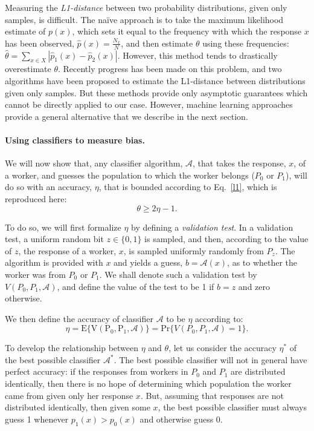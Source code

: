 \documentclass[12pt]{article}
\begin{document}
Measuring the \textit{L1-distance} between two probability distributions,
given only samples, is difficult.  The na\"ive approach is to take
the maximum likelihood estimate of $p(x)$, which sets it equal to the 
frequency with which the response $x$ has been observed, 
$\hat{p}(x) = \frac{N_x}{N}$, and then estimate $\theta$ 
using these frequencies: 
$\hat{\theta} = \sum_{x \in X}|\hat{p}_1(x) - \hat{p}_2(x)|$.  
However, this method tends to drastically overestimate $\theta$.
Recently progress has been made on this problem, and two algorithms have 
been proposed to estimate the L1-distance between distributions
given only samples.  But these methods provide only asymptotic guarantees
which cannot be directly applied to our case.  However, machine learning
approaches provide a general alternative that we describe in the next 
section.

\paragraph{Using classifiers to measure bias.}

We will now show that, any classifier algorithm, $\mathcal{A}$, that
takes the response, $x$, of a worker, and guesses the population to which
the worker belongs ($P_0$ or $P_1$), will do so with an accuracy, $\eta$,
that is bounded according to Eq.~\ref{l1}, which is reproduced here:
$$
	\theta \geq 2\eta - 1.
$$

To do so, we will first formalize $\eta$ by defining a 
\textit{validation test}.  In a validation test, a uniform random bit 
$z\in\{0,1\}$ is sampled, and then, according to the value of $z$, the
response of a worker, $x$, is sampled uniformly randomly from $P_z$.  
The algorithm is provided
with $x$ and yields a guess, $b=\mathcal{A}(x)$, as to whether the worker was 
from $P_0$ or $P_1$.  We shall denote such a validation test by 
$V(P_0, P_1, \mathcal{A})$, and define the value of the test to be 1 if 
$b=z$ and zero otherwise.  

We then define the accuracy of classifier $\mathcal{A}$ to be $\eta$ according
to:
$$
\eta = \mathrm{E\{V(P_0, P_1, \mathcal{A})\}} 
	= \mathrm{Pr}\{V(P_0, P_1, \mathcal{A})=1\}.
$$

To develop the relationship between $\eta$ and $\theta$, let us consider
the accuracy $\eta^*$ of the best possible classifier $\mathcal{A}^*$.
The best possible classifier will not in general have perfect accuracy:
if the responses from workers in $P_0$ and $P_1$ are distributed 
identically, then there is no hope of determining which population the worker 
came from given only her response $x$.  But, assuming that responses are
not distributed identically, then given some $x$, the best possible 
classifier must always guess 1 whenever $p_1(x) > p_0(x)$ and otherwise 
guess 0.
\end{document}
